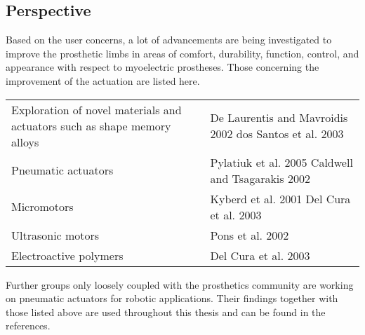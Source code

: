 \documentclass[main]{subfiles}
\begin{document}
\begin{comment}
The literature also indicates that the percentage of amputees who accept use of a myoelectric
prosthesis is approximately the same as those who prefer to use a body-powered prosthesis and
that self-selected use depends at least in part on the individual’s activities of daily living.
Appearance is most frequently cited as an advantage of myoelectric prostheses, and for patients
who desire a restorative appearance; the myoelectric prosthesis can provide greater function
than a passive prosthesis, with equivalent function to a body-powered prosthesis for light work.
Nonuse of any prosthesis is associated with lack of functional need, discomfort (excessive
weight and heat), and impediment to sensory feedback. Because of the differing advantages and
disadvantages of the currently available prostheses, myoelectric components for individuals
with an amputation at the wrist or above may be considered when passive or body-powered
prostheses cannot be used or are insufficient to meet the functional needs of the patient in
activities of daily living. Evidence is insufficient to evaluate full or partial hand prostheses with
individually powered digits; these are considered investigational.

[Bluecross Blueshield Alabama: Myoelectric Prosthetic Components for the Upper Limb]
\end{comment}

\subsection{Perspective}

Based on the user concerns, a lot of advancements are being investigated to improve the prosthetic limbs in areas of comfort, durability, function, control, and appearance with respect to myoelectric prostheses. Those concerning the improvement of the actuation are listed here.

\begin{tabular}{p{7cm}p{6cm}}
Exploration of novel materials and \newline actuators such as shape memory alloys & De Laurentis and Mavroidis 2002 \newline dos Santos et al. 2003\\
Pneumatic actuators & Pylatiuk et al. 2005 \newline Caldwell and Tsagarakis 2002\\
Micromotors & Kyberd et al. 2001 \newline Del Cura et al. 2003\\
Ultrasonic motors & Pons et al. 2002\\
Electroactive polymers & Del Cura et al. 2003\\                   
\end{tabular}

Further groups only loosely coupled with the prosthetics community are working on pneumatic actuators for robotic applications. Their findings together with those listed above are used throughout this thesis and can be found in the references.
\end{document}
